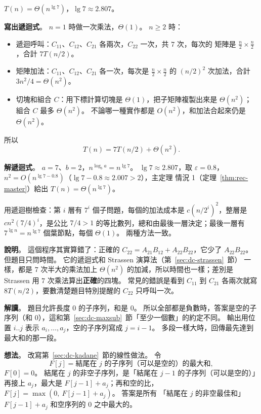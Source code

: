 $T(n) = \Theta(n^{\lg 7})$，$\lg 7 \approx 2.807$。

\textbf{寫出遞迴式}。 $n = 1$ 時做一次乘法，$\Theta(1)$。 $n \ge 2$ 時：
\begin{itemize}
\item 遞迴呼叫：$C_{11}$、$C_{12}$、$C_{21}$ 各兩次，$C_{22}$ 一次，共 $7$ 次，每次的
矩陣是 $\frac{n}{2} \times \frac{n}{2}$，合計 $7T(n/2)$。
\item 矩陣加法：$C_{11}$、$C_{12}$、$C_{21}$ 各一次，每次是 $\frac{n}{2} \times \frac{n}{2}$
的 $(n/2)^2$ 次加法，合計 $3n^2/4 = \Theta(n^2)$。
\item 切塊和組合 $C$：用下標計算切塊是 $\Theta(1)$，把子矩陣複製出來是 $\Theta(n^2)$；
組合 $C$ 最多 $\Theta(n^2)$。 不論哪一種實作都是 $O(n^2)$，和加法合起來仍是
$\Theta(n^2)$。
\end{itemize}
所以
\[
T(n) = 7T(n/2) + \Theta(n^2).
\]

\textbf{解遞迴式}。 $a = 7$、$b = 2$，$n^{\log_b a} = n^{\lg 7}$。 $\lg 7 \approx 2.807$，取
$\varepsilon = 0.8$，$n^2 = O(n^{\lg 7 - 0.8})$（$\lg 7 - 0.8 \approx 2.007 > 2$），主定理
情況 1（定理~\ref{thm:rec-master}）給出 $T(n) = \Theta(n^{\lg 7})$。

用遞迴樹檢查：第 $i$ 層有 $7^i$ 個子問題，每個的加法成本是 $c(n/2^i)^2$，整層是
$cn^2 (7/4)^i$，是公比 $7/4 > 1$ 的等比數列，總和由最後一層決定；最後一層有
$7^{\lg n} = n^{\lg 7}$ 個葉節點，每個 $\Theta(1)$。 兩種方法一致。

\textbf{說明}。 這個程序其實算錯了：正確的 $C_{22} = A_{21}B_{12} + A_{22}B_{22}$，它少了
$A_{22}B_{22}$。 但題目只問時間。 它的遞迴式和 Strassen 演算法（第~\ref{sec:dc-strassen}~節）
一樣，都是 $7$ 次半大的乘法加上 $\Theta(n^2)$ 的加減，所以時間也一樣；差別是 Strassen
用 $7$ 次乘法算出\textbf{正確}的四塊。 常見的錯誤是看到 $C_{11}$ 到 $C_{21}$ 各兩次就寫
$8T(n/2)$，要數清楚題目特別提醒的 $C_{22}$ 只呼叫一次。

\textbf{解讀}。 題目允許長度 $0$ 的子序列，和是 $0$。 所以全部都是負數時，答案是空的子
序列（和 $0$），這和第~\ref{sec:dc-maxsub}~節「至少一個數」的約定不同。 輸出用位置
$i..j$ 表示 $a_i, \ldots, a_j$，空的子序列寫成 $j = i - 1$。 多段一樣大時，回傳最先達到
最大和的那一段。

\textbf{想法}。 改寫第~\ref{sec:dc-kadane}~節的線性做法。 令
\[
F[j] = \text{結尾在 } j \text{ 的子序列（可以是空的）的最大和},
\]
$F[0] = 0$。 結尾在 $j$ 的非空子序列，是「結尾在 $j - 1$ 的子序列（可以是空的）」再接上
$a_j$，最大是 $F[j-1] + a_j$；再和空的比，$F[j] = \max(0,\ F[j-1] + a_j)$。 答案是所有
「結尾在 $j$ 的非空最佳和」$F[j-1] + a_j$ 和空序列的 $0$ 之中最大的。

